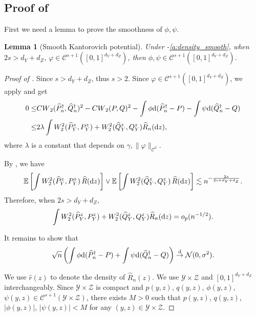 \documentclass{article}
\theoremstyle{plain}
\newtheorem{lemma}{Lemma}[section]
\theoremstyle{definition}
\def\EE{\mathbb{E}}
\def\PP{P}
\def\QQ{Q}
\def\calC{\mathcal{C}}
\def\calN{\mathcal{N}}
\theoremstyle{plain}
\newcommand{\diff}{{\rm d}}
\def\EE{\mathbb{E}}
\def\calC{\mathcal{C}}
\def\calN{\mathcal{N}}
\newcommand{\Cwass}{{CW}}
\begin{document}
\subsection{Proof of }\label{appe:sec:proof:theo:CLT}
First we need a lemma to prove the smoothness of $\phi, \psi$.
\begin{lemma}[Smooth Kantorovich potential]\label{lem:smooth_kan}
    Under -\ref{a:density_smooth}, when $2s > d_Y + d_Z$, $\varphi \in \calC^{s+1}([0,1]^{d_Y+d_Z})$, then $\phi, \psi \in \calC^{s+1}([0,1]^{d_Y+d_Z})$.
\end{lemma}



\begin{proof}[Proof of ]
    Since $s > d_Y + d_Z$, thus $s > 2$. Since $\varphi \in \calC^{s+1}([0,1]^{d_Y + d_Z})$, we apply  and get
    \begin{align*}
        0 \leq & \Cwass_2(\widehat P_n^{\dagger},\widehat Q_n^{\dagger})^2 - \Cwass_2(\PP,\QQ)^2 - \int \phi \diff (\widehat P_n^{\dagger} - \PP) - \int \psi \diff (\widehat Q_n^{\dagger} - \QQ) \\
        \leq & 2\lambda \int W^2_2(\widehat \PP_Y^z, \PP_Y^z) + W^2_2(\widehat \QQ_Y^z, \QQ_Y^z) \widehat R_{n}(\diff z),
    \end{align*}
    where $\lambda$ is a constant that depends on $\gamma, \|\varphi\|_{\calC^2}$. 

    By , we have 
    \[
         \EE\left[\int W^2_2(\widehat \PP_Y^z, \PP_Y^z) \, \widehat R(\diff z)\right] \vee \EE\left[\int W^2_2(\widehat \QQ_Y^z, \QQ_Y^z) \, \widehat R(\diff z)\right] \lesssim n^{-\frac{2s}{2s+d_Y+d_Z}}.
    \]
    Therefore, when $2s > d_Y+d_Z$, 
    \[
        \int W^2_2(\widehat \PP_Y^z, \PP_Y^z) + W^2_2(\widehat \QQ_Y^z, \QQ_Y^z) \widehat R_{n}(\diff z) = o_p(n^{-1/2}).
    \]
        
    It remains to show that 
    \[
        \sqrt{n} \left(\int \phi \diff (\widehat P_n^{\dagger} - \PP) +  \int \psi \diff (\widehat Q_n^{\dagger} - \QQ) \right) \overset{\textup{d}}{\rightarrow} \calN(0, \sigma^2).
    \]
    
    
We use $\hat r(z)$ to denote the density of $\widehat R_{n}(z)$.
We use $\mathcal Y \times \mathcal Z$ and $[0,1]^{d_Y+d_Z}$ interchangeably.
Since $\mathcal Y \times \mathcal Z$ is compact and $p(y,z)$, $q(y,z)$, $\phi(y,z)$, $\psi(y,z) \in \mathcal C^{s+1}(\mathcal Y \times \mathcal Z)$, there exists $M > 0$ such that $p(y,z)$, $q(y,z)$, $|\phi(y,z)|$, $|\psi(y,z)| < M$ for any $(y,z) \in \mathcal Y \times \mathcal Z$.



\end{proof}
\end{document}
